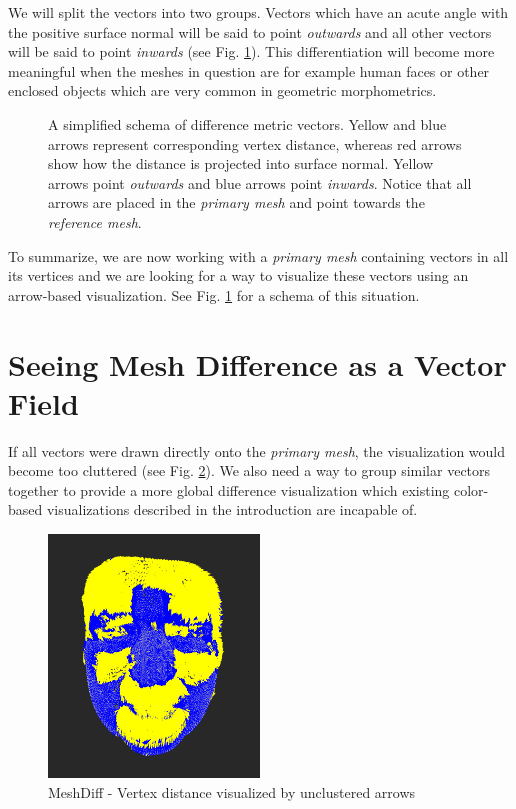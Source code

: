 We will split the vectors into two groups. Vectors which have an acute angle with the positive surface normal will be said to point {\it outwards} and all other vectors will be said to point {\it inwards} (see Fig. \ref{fig:input}). This differentiation will become more meaningful when the meshes in question are for example human faces or other enclosed objects which are very common in geometric morphometrics.

\begin{figure}[h]
\centering
\def\svgwidth{\textwidth}

\caption[Input Illustration]{A simplified schema of difference metric vectors. Yellow and blue arrows represent corresponding vertex distance, whereas red arrows show how the distance is projected into surface normal. Yellow arrows point {\it outwards} and blue arrows point {\it inwards}. Notice that all arrows are placed in the {\it primary mesh} and point towards the {\it reference mesh}.}
\label{fig:input}
\end{figure}

To summarize, we are now working with a {\it primary mesh} containing vectors in all its vertices and we are looking for a way to visualize these vectors using an arrow-based visualization. See Fig. \ref{fig:input} for a schema of this situation.

\section{Seeing Mesh Difference as a Vector Field}

If all vectors were drawn directly onto the {\it primary mesh}, the visualization would become too cluttered (see Fig. \ref{fig:meshdiff_unclustered}). We also need a way to group similar vectors together to provide a more global difference visualization which existing color-based visualizations described in the introduction are incapable of.

\begin{figure}[h]
\centering
\includegraphics[width=0.5\textwidth]{./img/meshdiff-unclustered_arrows-single.png}
\caption[MeshDiff - Vertex distance visualized by unclustered arrows]{MeshDiff - Vertex distance visualized by unclustered arrows}
\label{fig:meshdiff_unclustered}
\end{figure}

